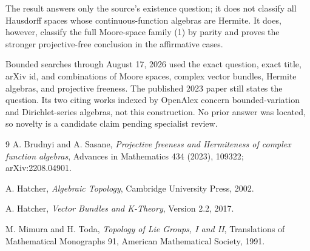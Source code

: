 \documentclass[11pt]{article}
\theoremstyle{remark}
\begin{document}
The result answers only the source's existence question; it does not
classify all Hausdorff spaces whose continuous-function algebras are
Hermite.  It does, however, classify the full Moore-space family (1) by
parity and proves the stronger projective-free conclusion in the affirmative
cases.

Bounded searches through August 17, 2026 used the exact question, exact
title, arXiv id, and combinations of Moore spaces, complex vector bundles,
Hermite algebras, and projective freeness.  The published 2023 paper still
states the question.  Its two citing works indexed by OpenAlex concern
bounded-variation and Dirichlet-series algebras, not this construction.  No
prior answer was located, so novelty is a candidate claim pending specialist
review.

\begin{thebibliography}{9}
A. Brudnyi and A. Sasane,
\emph{Projective freeness and Hermiteness of complex function algebras},
Advances in Mathematics 434 (2023), 109322;
arXiv:2208.04901.

A. Hatcher,
\emph{Algebraic Topology},
Cambridge University Press, 2002.

A. Hatcher,
\emph{Vector Bundles and K-Theory},
Version 2.2, 2017.

M. Mimura and H. Toda,
\emph{Topology of Lie Groups, I and II},
Translations of Mathematical Monographs 91,
American Mathematical Society, 1991.
\end{thebibliography}
\end{document}

